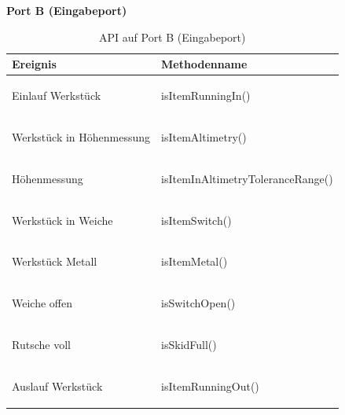 \documentclass[a4paper, 11pt]{article}
\begin{document}
\newpage

\noindent\textbf{Port B (Eingabeport)}
\begin{table}[h]
\center
\begin{tabularx}{\textwidth}{|X|X|}
\hline
\textbf{Ereignis}&\textbf{Methodenname}\\
\hline
Einlauf Werkstück&\begin{compactenum}[]
           \item \ttfamily isItemRunningIn()
           \end{compactenum}\\
\hline
Werkstück in Höhenmessung&\begin{compactenum}[]
           \item \ttfamily isItemAltimetry()
           \end{compactenum}\\
\hline
Höhenmessung&\begin{compactenum}[]
           \item \ttfamily isItemInAltimetryToleranceRange()
           \end{compactenum}\\
\hline
Werkstück in Weiche&\begin{compactenum}[]
           \item \ttfamily isItemSwitch()
           \end{compactenum}\\
\hline
Werkstück Metall&\begin{compactenum}[]
           \item \ttfamily isItemMetal()
           \end{compactenum}\\
\hline
Weiche offen&\begin{compactenum}[]
           \item \ttfamily isSwitchOpen()
           \end{compactenum}\\
\hline
Rutsche voll&\begin{compactenum}[]
           \item \ttfamily isSkidFull()
           \end{compactenum}\\
\hline
Auslauf Werkstück&\begin{compactenum}[]
           \item \ttfamily isItemRunningOut()
           \end{compactenum}\\
\hline
\end{tabularx}
\caption{API auf Port B (Eingabeport)}
\label{portB}
\end{table}
\end{document}
